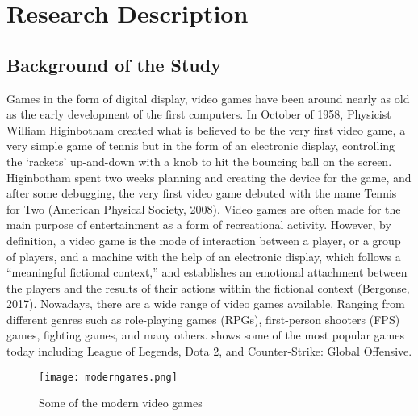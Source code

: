 %
%
%                 

\chapter{Research Description}
\label{sec:researchdesc}    %

\section{Background of the Study}
Games in the form of digital display, video games have been around nearly as old as the early development of the first computers. In October of 1958, Physicist  William Higinbotham created what is believed to be the very first video game, a very simple game of tennis but in the form of an electronic display, controlling the ‘rackets’ up-and-down with a knob to hit the bouncing ball on the screen. Higinbotham spent two weeks planning and creating the device for the game, and after some debugging, the very first video game debuted with the name Tennis for Two (American Physical Society, 2008). Video games are often made for the main purpose of entertainment as a form of recreational activity. However, by definition, a video game is the mode of interaction between a player, or a group of players, and a machine with the help of an electronic display, which follows a “meaningful fictional context,” and establishes an emotional attachment between the players and the results of their actions within the fictional context (Bergonse, 2017). Nowadays, there are a wide range of video games available. Ranging from different genres such as role-playing games (RPGs), first-person shooters (FPS) games, fighting games, and many others.  shows some of the most popular games today including League of Legends, Dota 2, and Counter-Strike: Global Offensive.

\begin{figure}[h]                %
   \centering                    %
   \texttt{[image: moderngames.png]}      %
   \caption{Some of the modern video games}
    \label{fig:moderngames}
\end{figure}


